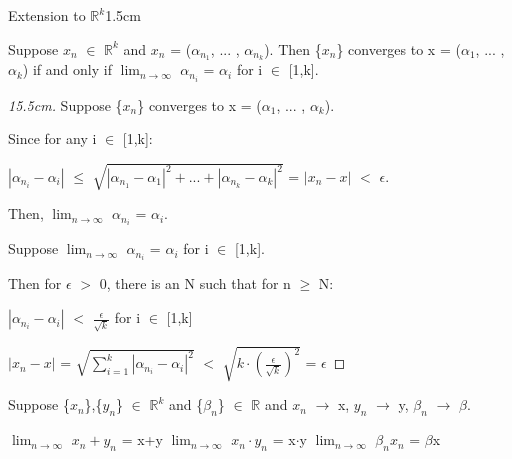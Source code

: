     \begin{ltheorem}{Extension to $\mathbb{R}^k$}{1.5cm}
        \item Suppose $x_n$ $\in$ $\mathbb{R}^k$ and $x_n$
            = ($\alpha_{n_1}$, ... , $\alpha_{n_k}$).
            Then \{$x_n$\} converges to x = ($\alpha_1$, ... , $\alpha_k$)
            if and only if $\lim_{n \rightarrow \infty}$ $\alpha_{n_i}$ = $\alpha_i$
            for i $\in$ [1,k].

            \begin{proof}[15.5cm]
                Suppose \{$x_n$\} converges to x = ($\alpha_1$, ... , $\alpha_k$).
                
                Since for any i $\in$ [1,k]:

                \hspace{1cm}
                $|\alpha_{n_i} - \alpha_i|$
                $\leq$ $\sqrt{|\alpha_{n_1} - \alpha_1|^2
                                + ... + |\alpha_{n_k} - \alpha_k|^2}$
                = $|x_n - x|$ $<$ $\epsilon$.

                Then, $\lim_{n \rightarrow \infty}$ $\alpha_{n_i}$ = $\alpha_i$.

                \vspace{0.2cm}

                Suppose $\lim_{n \rightarrow \infty}$ $\alpha_{n_i}$ = $\alpha_i$
                for i $\in$ [1,k].
                
                Then for $\epsilon$ $>$ 0, there is an N such that for n $\geq$ N:

                \hspace{1cm}
                $|\alpha_{n_i} - \alpha_i|$ $<$ $\frac{\epsilon}{\sqrt{k}}$
                for i $\in$ [1,k]

                \hspace{1cm}
                $|x_n - x|$
                = $\sqrt{\sum_{i=1}^k |\alpha_{n_i} - \alpha_i|^2}$
                $<$ $\sqrt{k \cdot (\frac{\epsilon}{\sqrt{k}})^2}$
                = $\epsilon$
            \end{proof}

        \item Suppose \{$x_n$\},\{$y_n$\} $\in$ $\mathbb{R}^k$ and
            \{$\beta_n$\} $\in$ $\mathbb{R}$ and $x_n$ $\rightarrow$ x,
            $y_n$ $\rightarrow$ y, $\beta_n$ $\rightarrow$ $\beta$.
            
            $\lim_{n \rightarrow \infty}$ $x_n + y_n$ = x+y
            \hspace{0.5cm}
            $\lim_{n \rightarrow \infty}$ $x_n \cdot y_n$ = x$\cdot$y
            \hspace{0.5cm}
            $\lim_{n \rightarrow \infty}$ $\beta_n x_n$ = $\beta$x


\end{ltheorem}
